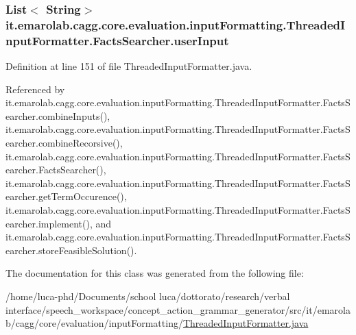 \hypertarget{classit_1_1emarolab_1_1cagg_1_1core_1_1evaluation_1_1inputFormatting_1_1ThreadedInputFormatter_1_1FactsSearcher_a4cdee8a1a302117f14597c0457b2af6c}{
\subsubsection[{user\-Input}]{\setlength{\rightskip}{0pt plus 5cm}List$<$ String$>$ it.\-emarolab.\-cagg.\-core.\-evaluation.\-input\-Formatting.\-Threaded\-Input\-Formatter.\-Facts\-Searcher.\-user\-Input\hspace{0.3cm}{\ttfamily [private]}}}\label{classit_1_1emarolab_1_1cagg_1_1core_1_1evaluation_1_1inputFormatting_1_1ThreadedInputFormatter_1_1FactsSearcher_a4cdee8a1a302117f14597c0457b2af6c}


Definition at line 151 of file Threaded\-Input\-Formatter.\-java.



Referenced by it.\-emarolab.\-cagg.\-core.\-evaluation.\-input\-Formatting.\-Threaded\-Input\-Formatter.\-Facts\-Searcher.\-combine\-Inputs(), it.\-emarolab.\-cagg.\-core.\-evaluation.\-input\-Formatting.\-Threaded\-Input\-Formatter.\-Facts\-Searcher.\-combine\-Recorsive(), it.\-emarolab.\-cagg.\-core.\-evaluation.\-input\-Formatting.\-Threaded\-Input\-Formatter.\-Facts\-Searcher.\-Facts\-Searcher(), it.\-emarolab.\-cagg.\-core.\-evaluation.\-input\-Formatting.\-Threaded\-Input\-Formatter.\-Facts\-Searcher.\-get\-Term\-Occurence(), it.\-emarolab.\-cagg.\-core.\-evaluation.\-input\-Formatting.\-Threaded\-Input\-Formatter.\-Facts\-Searcher.\-implement(), and it.\-emarolab.\-cagg.\-core.\-evaluation.\-input\-Formatting.\-Threaded\-Input\-Formatter.\-Facts\-Searcher.\-store\-Feasible\-Solution().



The documentation for this class was generated from the following file\-:\begin{DoxyCompactItemize}
\item 
/home/luca-\/phd/\-Documents/school luca/dottorato/research/verbal interface/speech\-\_\-workspace/concept\-\_\-action\-\_\-grammar\-\_\-generator/src/it/emarolab/cagg/core/evaluation/input\-Formatting/\hyperlink{ThreadedInputFormatter_8java}{Threaded\-Input\-Formatter.\-java}\end{DoxyCompactItemize}
